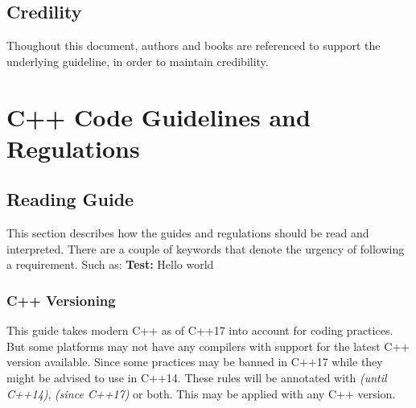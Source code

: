 \documentclass[12pt]{article}
\newcommand{\cppuntil}[1]{\footnotesize\textit{(until C++#1)}\normalsize}
\newcommand{\cppsince}[1]{\footnotesize\textit{(since C++#1)}\normalsize}
\begin{document}
\subsection{Credility}
Thoughout this document, authors and books are referenced to support the
underlying guideline, in order to maintain credibility.
\newpage
\section{C++ Code Guidelines and Regulations}
\subsection{Reading Guide}
This section describes how the guides and regulations should be read and
interpreted. There are a couple of keywords that denote the urgency of
following a requirement. Such as:
\bigbreak
\textbf{Test:} Hello world
\subsubsection{C++ Versioning}
This guide takes modern C++ as of C++17 into account for coding practices. But
some platforms may not have any compilers with support for the latest C++
version available. Since some practices may be banned in C++17 while they might
be advised to use in C++14. These rules will be annotated with \cppuntil{14},
\cppsince{17} or both. This may be applied with any C++ version.

\newpage
\printbibliography

\newpage
\begin{appendix}
\end{appendix}
\end{document}
